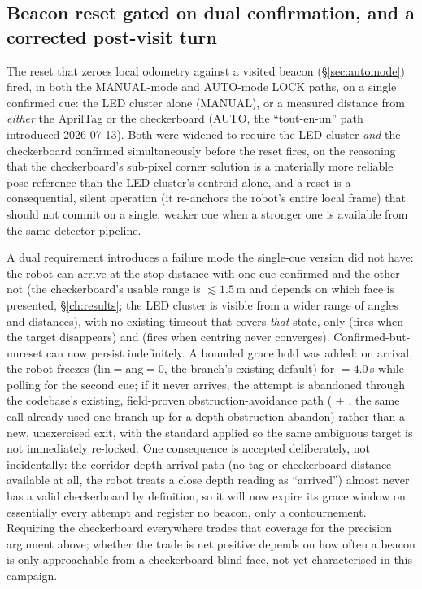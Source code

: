 \subsection{Beacon reset gated on dual confirmation, and a corrected post-visit turn}
\label{sec:dualconfirm}
The reset that zeroes local odometry against a visited beacon
(\S\ref{sec:automode}) fired, in both the MANUAL-mode and AUTO-mode LOCK
paths, on a single confirmed cue: the LED cluster alone (MANUAL), or a
measured distance from \emph{either} the AprilTag or the checkerboard
(AUTO, the ``tout-en-un'' path introduced 2026-07-13). Both were widened
to require the LED cluster \emph{and} the checkerboard confirmed
simultaneously before the reset fires, on the reasoning that the
checkerboard's sub-pixel corner solution is a materially more reliable
pose reference than the LED cluster's centroid alone, and a reset is a
consequential, silent operation (it re-anchors the robot's entire local
frame) that should not commit on a single, weaker cue when a stronger one
is available from the same detector pipeline.

A dual requirement introduces a failure mode the single-cue version did
not have: the robot can arrive at the stop distance with one cue confirmed
and the other not (the checkerboard's usable range is $\lesssim 1.5$\,m
and depends on which face is presented, \S\ref{ch:results}; the LED
cluster is visible from a wider range of angles and distances), with no
existing timeout that covers \emph{that} state, only 
(fires when the target disappears) and  (fires when
centring never converges). Confirmed-but-unreset can now persist
indefinitely. A bounded grace hold was added: on arrival, the robot freezes
($\text{lin}=\text{ang}=0$, the branch's existing default) for
 $=4.0$\,s while polling for the second cue;
if it never arrives, the attempt is abandoned through the codebase's
existing, field-proven obstruction-avoidance path
( $+$ , the same call already
used one branch up for a depth-obstruction abandon) rather than a new,
unexercised exit, with the standard  applied so the
same ambiguous target is not immediately re-locked. One consequence is
accepted deliberately, not incidentally: the corridor-depth arrival path
(no tag or checkerboard distance available at all, the robot treats a
close depth reading as ``arrived'') almost never has a valid checkerboard
by definition, so it will now expire its grace window on essentially every
attempt and register no beacon, only a contournement. Requiring the
checkerboard everywhere trades that coverage for the precision argument
above; whether the trade is net positive depends on how often a beacon is
only approachable from a checkerboard-blind face, not yet characterised in
this campaign.

